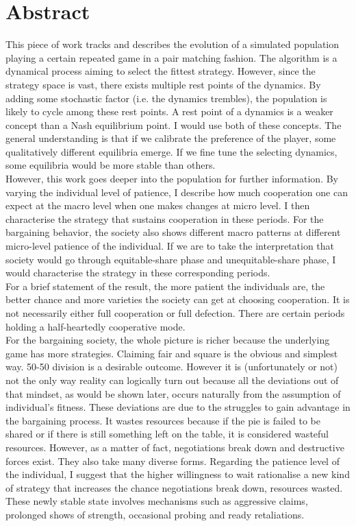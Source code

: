 \documentclass[12.5pt]{report}
\begin{document}
\chapter*{Abstract}

This piece of work tracks and describes the evolution of a simulated population playing a certain repeated game in a pair matching fashion. The algorithm is a dynamical process aiming to select the fittest strategy. However, since the strategy space is vast, there exists multiple rest points of the dynamics. By adding some stochastic factor (i.e. the dynamics trembles), the population is likely to cycle among these rest points. A rest point of a dynamics is a weaker concept than a Nash equilibrium point. I would use both of these concepts. The general understanding is that if we calibrate the preference of the player, some qualitatively different equilibria emerge. If we fine tune the selecting dynamics, some equilibria would be more stable than others.\\

However, this work goes deeper into the population for further information. By varying the individual level of patience, I describe how much cooperation one can expect at the macro level when one makes changes at micro level. I then characterise the strategy that sustains cooperation in these periods. For the bargaining behavior, the society also shows different macro patterns at different micro-level patience of the individual. If we are to take the interpretation that society would go through equitable-share phase and unequitable-share phase, I would characterise the strategy in these corresponding periods.\\

For a brief statement of the result, the more patient the individuals are, the better chance and more varieties the society can get at choosing cooperation. It is not necessarily either full cooperation or full defection. There are certain periods holding a half-heartedly cooperative mode.\\

For the bargaining society, the whole picture is richer because the underlying game has more strategies. Claiming fair and square is the obvious and simplest way. 50-50 division is a desirable outcome. However it is (unfortunately or not) not the only way reality can logically turn out because all the deviations out of that mindset, as would be shown later, occurs naturally from the assumption of individual's fitness. These deviations are due to the struggles to gain advantage in the bargaining process. It wastes resources because if the pie is failed to be shared or if there is still something left on the table, it is considered wasteful resources. However, as a matter of fact, negotiations break down and destructive forces exist. They also take many diverse forms. Regarding the patience level of the individual, I suggest that the higher willingness to wait rationalise a new kind of strategy that increases the chance negotiations break down, resources wasted. These newly stable state involves mechanisms such as aggressive claims, prolonged shows of strength, occasional probing and ready retaliations. 
\end{document}
